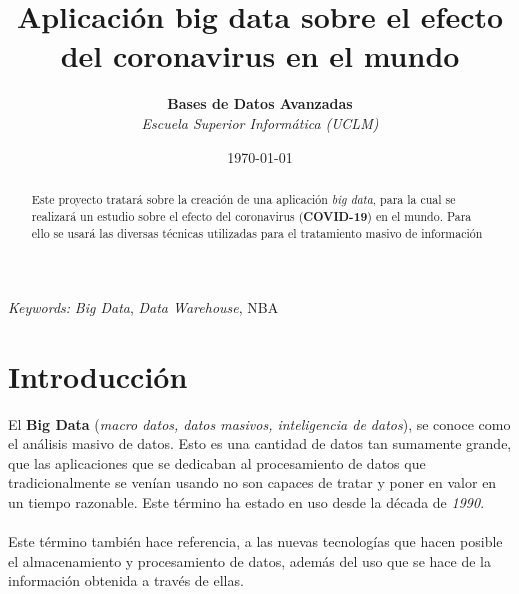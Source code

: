 \documentclass[11pt]{diazessay} %
\title{\textbf{Aplicación big data sobre el efecto del coronavirus en el mundo}} %
\author{\textbf{Bases de Datos Avanzadas} \\ \textit{Escuela Superior Informática (UCLM)}} %
\date{\today} %
\begin{document}
\maketitle %



\begin{abstract}
	
	Este proyecto tratará sobre la creación de una aplicación \textit{big data}, para la cual se realizará un estudio sobre el efecto del coronavirus (\textbf{COVID-19}) en el mundo. Para ello se usará las diversas técnicas utilizadas para el tratamiento masivo de información

\end{abstract}

\hspace*{3.6mm}\textit{Keywords:} \textit{Big Data}, \textit{Data Warehouse}, NBA

\vspace{20pt} %


\section*{Introducción}
El \textbf{Big Data} (\textit{macro datos, datos masivos, inteligencia de datos}), se conoce como el análisis masivo de datos. Esto es una cantidad de datos tan sumamente grande, que las aplicaciones que se dedicaban al  procesamiento de datos que tradicionalmente se venían usando no son capaces de tratar y poner en valor en un tiempo razonable. Este  término ha estado en uso desde la década de \textit{1990}.\\\\
Este término también hace referencia, a las nuevas tecnologías que hacen posible el almacenamiento y procesamiento de datos, además del uso que se hace de la información obtenida a través de ellas.
\end{document}

